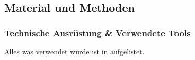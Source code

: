 
\subsection{Material und Methoden}

\subsubsection{Technische Ausrüstung \& Verwendete Tools} %

Alles was verwendet wurde ist in  aufgelistet.

